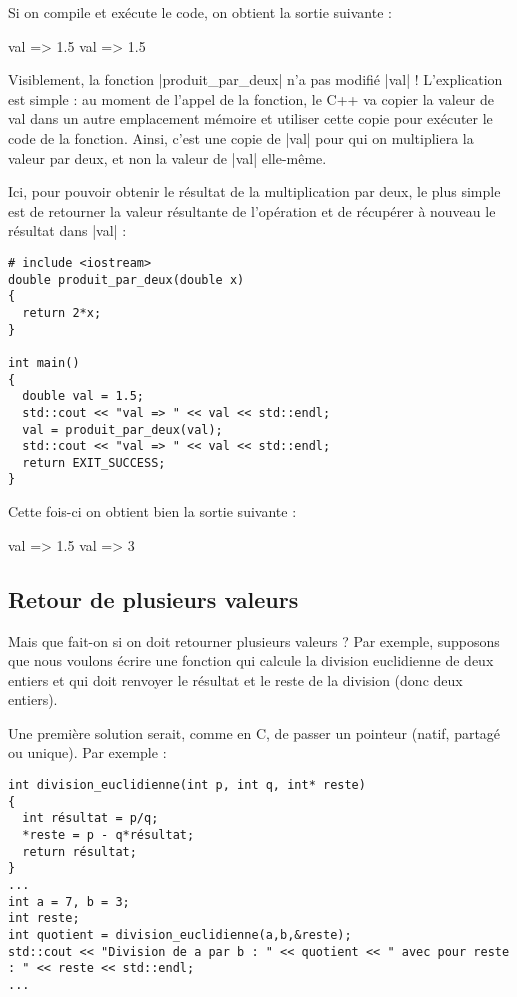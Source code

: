 \begin{itemize}
Si on compile et exécute le code, on obtient la sortie suivante :

\begin{inverseverbatim}
val => 1.5
val => 1.5
\end{inverseverbatim}

Visiblement, la fonction |produit_par_deux| n'a pas modifié |val| ! L'explication est simple : au
moment de l'appel de la fonction, le C++ va copier la valeur de val dans un autre emplacement mémoire
et utiliser cette copie pour exécuter le code de la fonction. Ainsi, c'est une copie de |val| pour qui
on multipliera la valeur par deux, et non la valeur de |val| elle-même.

Ici, pour pouvoir obtenir le résultat de la multiplication par deux, le plus simple est de retourner la
valeur résultante de l'opération et de récupérer à nouveau le résultat dans |val| :
\begin{lstlisting}
# include <iostream>
double produit_par_deux(double x)
{
  return 2*x;
}

int main()
{
  double val = 1.5;
  std::cout << "val => " << val << std::endl;
  val = produit_par_deux(val);
  std::cout << "val => " << val << std::endl;
  return EXIT_SUCCESS;      
}
\end{lstlisting}

Cette fois-ci on obtient bien la sortie suivante :
\begin{inverseverbatim}
val => 1.5
val => 3
\end{inverseverbatim}

\subsection{Retour de plusieurs valeurs}

Mais que fait-on si on doit retourner plusieurs valeurs ? Par exemple, supposons que nous voulons
écrire une fonction qui calcule la division euclidienne de deux entiers et qui doit renvoyer 
le résultat et le reste de la division (donc deux entiers).

Une première solution serait, comme en C, de passer un pointeur (natif, partagé ou unique).
Par exemple :
\begin{lstlisting}
int division_euclidienne(int p, int q, int* reste)
{
  int résultat = p/q;
  *reste = p - q*résultat;
  return résultat;
}
...
int a = 7, b = 3;
int reste;
int quotient = division_euclidienne(a,b,&reste);
std::cout << "Division de a par b : " << quotient << " avec pour reste : " << reste << std::endl;
...
\end{lstlisting}


\end{itemize}
